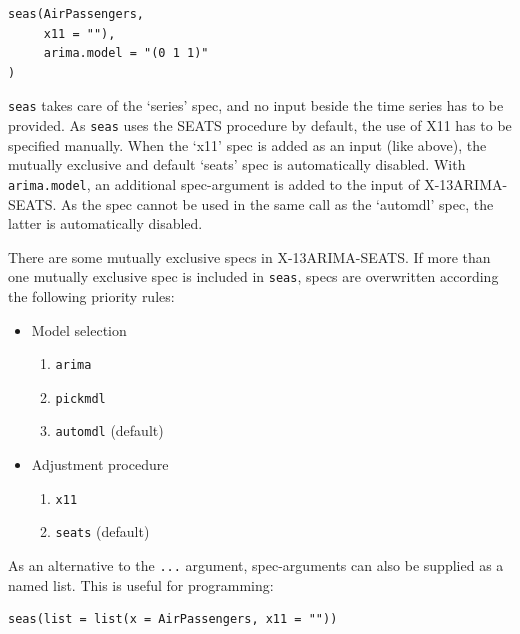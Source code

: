 \begin{verbatim}
seas(AirPassengers,
     x11 = ""),
     arima.model = "(0 1 1)"
)
\end{verbatim}

\texttt{seas} takes care of the `series' spec, and no input beside the
time series has to be provided. As \texttt{seas} uses the SEATS
procedure by default, the use of X11 has to be specified manually. When
the `x11' spec is added as an input (like above), the mutually exclusive
and default `seats' spec is automatically disabled. With
\texttt{arima.model}, an additional spec-argument is added to the input
of X-13ARIMA-SEATS. As the spec cannot be used in the same call as the
`automdl' spec, the latter is automatically disabled.

There are some mutually exclusive specs in X-13ARIMA-SEATS. If more than
one mutually exclusive spec is included in \texttt{seas}, specs are
overwritten according the following priority rules:

\begin{itemize}
\itemsep1pt\parskip0pt
\item
  Model selection

  \begin{enumerate}
  \def\labelenumi{\arabic{enumi}.}
  \itemsep1pt\parskip0pt
  \item
    \texttt{arima}
  \item
    \texttt{pickmdl}
  \item
    \texttt{automdl} (default)
  \end{enumerate}
\item
  Adjustment procedure

  \begin{enumerate}
  \def\labelenumi{\arabic{enumi}.}
  \itemsep1pt\parskip0pt
  \item
    \texttt{x11}
  \item
    \texttt{seats} (default)
  \end{enumerate}
\end{itemize}

As an alternative to the \texttt{...} argument, spec-arguments can also
be supplied as a named list. This is useful for programming:

\begin{verbatim}
seas(list = list(x = AirPassengers, x11 = ""))
\end{verbatim}


